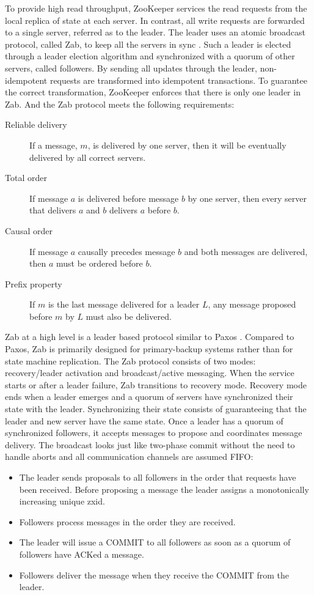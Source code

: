 \documentclass[11pt]{book}
\begin{document}
To provide high read throughput, ZooKeeper services the read requests from the local replica of state at each server. In contrast, all write requests are forwarded to a single server, referred as to the leader. The leader uses an atomic broadcast protocol, called Zab, to keep all the servers in sync \cite{Reed:2008:STO}. Such a leader is elected through a leader election algorithm and synchronized with a quorum of other servers, called followers. By sending all updates through the leader, non-idempotent requests are transformed into idempotent transactions. To guarantee the correct transformation, ZooKeeper enforces that there is only one leader in Zab. And the Zab protocol meets the following requirements:
\begin{description}
\item[Reliable delivery] If a message, $m$, is delivered by one server, then it will be eventually delivered by all correct servers.
\item[Total order] If message $a$ is delivered before message $b$ by one server, then every server that delivers $a$ and $b$ delivers $a$ before $b$.
\item[Causal order] If message $a$ causally precedes message $b$ and both messages are delivered, then $a$ must be ordered before $b$.
\item[Prefix property] If $m$ is the last message delivered for a leader $L$, any message proposed before $m$ by $L$ must also be delivered.
\end{description}

Zab at a high level is a leader based protocol similar to Paxos \cite{Lamport:1998:PP}. Compared to Paxos, Zab is primarily designed for primary-backup systems rather than for state machine replication.
The Zab protocol consists of two modes: recovery/leader activation and broadcast/active messaging. When the service starts or after a leader failure, Zab transitions to recovery mode. Recovery mode ends when a leader emerges and a quorum of servers have synchronized their state with the leader. Synchronizing their state consists of guaranteeing that the leader and new server have the same state.
Once a leader has a quorum of synchronized followers, it accepts messages to propose and coordinates message delivery. The broadcast looks just like two-phase commit \cite{opac:2009} without the need to handle aborts and all communication channels are assumed FIFO:
\begin{itemize}
\item The leader sends proposals to all followers in the order that requests have been received. Before proposing a message the leader assigns a monotonically increasing unique zxid.
\item Followers process messages in the order they are received.
\item The leader will issue a COMMIT to all followers as soon as a quorum of followers have ACKed a message.
\item Followers deliver the message when they receive the COMMIT from the leader.
\end{itemize}
\end{document}
